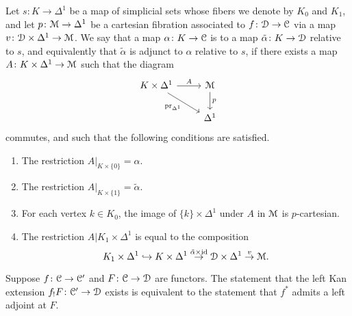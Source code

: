 \documentclass[main.tex]{subfiles}
\begin{document}
\begin{definition}
  \label{def:adjunct_local}
  Let $s\colon K \to \Delta^{1}$ be a map of simplicial sets whose fibers we denote by $K_{0}$ and $K_{1}$, and let $p\colon \mathcal{M} \to \Delta^{1}$ be a cartesian fibration associated to $f\colon \mathcal{D} \to \mathcal{C}$ via a map $v\colon \mathcal{D} \times \Delta^{1} \to \mathcal{M}$. We say that a map $\alpha\colon K \to \mathcal{C}$ is  to a map $\tilde{\alpha}\colon K \to \mathcal{D}$ relative to $s$, and equivalently that $\tilde{\alpha}$ is adjunct to $\alpha$ relative to $s$, if there exists a map $A\colon K \times \Delta^{1} \to \mathcal{M}$ such that the diagram
  \begin{equation*}
    \begin{tikzcd}
      K \times \Delta^{1}
      \arrow[r, "A"]
      \arrow[dr, swap, "\pr_{\Delta^{1}}"]
      & \category{M}
      \arrow[d, "p"]
      \\
      & \Delta^{1}
    \end{tikzcd}
  \end{equation*}
  commutes, and such that the following conditions are satisfied.
  \begin{enumerate}
    \item The restriction $A|_{K \times \{0\}} = \alpha$.

    \item The restriction $A|_{K \times \{1\}} = \tilde{\alpha}$.

    \item For each vertex $k \in K_{0}$, the image of $\{k\} \times \Delta^{1}$ under $A$ in $\mathcal{M}$ is $p$-cartesian.

    \item The restriction $A|K_{1} \times \Delta^{1}$ is equal to the composition
      \begin{equation*}
        K_{1} \times \Delta^{1} \hookrightarrow K \times \Delta^{1} \overset{\tilde{\alpha} \times \mathrm{id}}{\to} \mathcal{D} \times \Delta^{1} \overset{v}{\to} \mathcal{M}.
      \end{equation*}
  \end{enumerate}
\end{definition}

\begin{example}
  \label{eg:partial_adjunctions_and_kan_extensions}
  Suppose $f\colon \mathcal{C} \to \mathcal{C}'$ and $F\colon \mathcal{C} \to \mathcal{D}$ are functors. The statement that the left Kan extension $f_{!}F\colon \mathcal{C'} \to \mathcal{D}$ exists is equivalent to the statement that $f^{*}$ admits a left adjoint at $F$.
\end{example}
\end{document}
